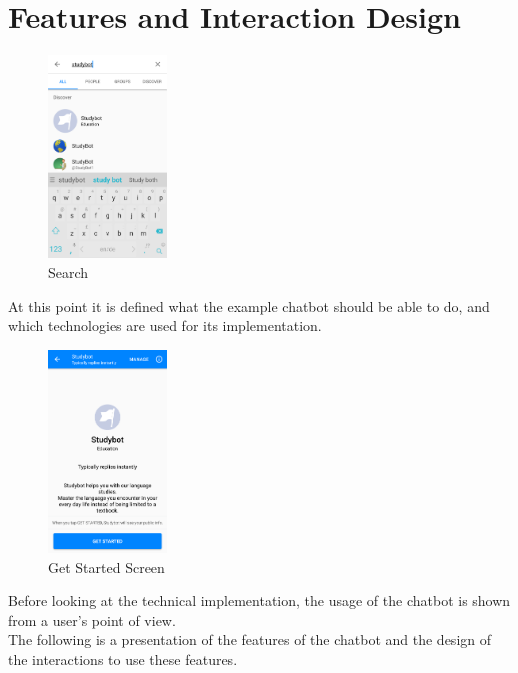 \section{Features and Interaction Design}
\label{implementation}


\begin{figure}
  \centering
  \includegraphics[width=0.28\textwidth]{images/interface/01-search.png}
	\caption{Search}
	\label{fig:01-search}
\end{figure}

At this point it is defined what the example chatbot should be able to do,
and which technologies are used for its implementation.
\\

\begin{figure}
  \centering
  \includegraphics[width=0.28\textwidth]{images/interface/02-getstarted.png}
	\caption{Get Started Screen}
	\label{fig:02-getstarted}
\end{figure}


Before looking at the technical implementation,
the usage of the chatbot is shown from a user's point of view.
\\
The following is a presentation of the features of the chatbot
and the design of the interactions to use these features.
\\

